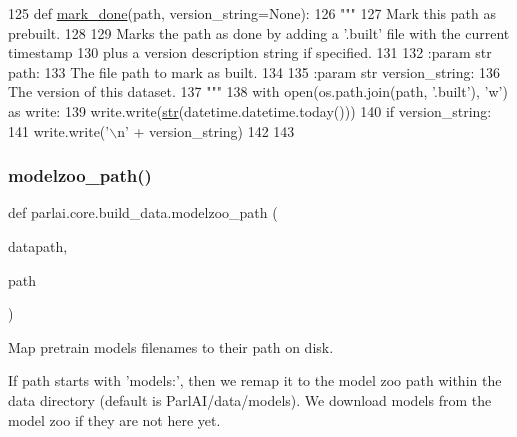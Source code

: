 \begin{DoxyCode}
125 \textcolor{keyword}{def }\hyperlink{namespaceparlai_1_1core_1_1build__data_a2527e6d29b0ccb7b841182890ac36a59}{mark\_done}(path, version\_string=None):
126     \textcolor{stringliteral}{"""}
127 \textcolor{stringliteral}{    Mark this path as prebuilt.}
128 \textcolor{stringliteral}{}
129 \textcolor{stringliteral}{    Marks the path as done by adding a '.built' file with the current timestamp}
130 \textcolor{stringliteral}{    plus a version description string if specified.}
131 \textcolor{stringliteral}{}
132 \textcolor{stringliteral}{    :param str path:}
133 \textcolor{stringliteral}{        The file path to mark as built.}
134 \textcolor{stringliteral}{}
135 \textcolor{stringliteral}{    :param str version\_string:}
136 \textcolor{stringliteral}{        The version of this dataset.}
137 \textcolor{stringliteral}{    """}
138     with open(os.path.join(path, \textcolor{stringliteral}{'.built'}), \textcolor{stringliteral}{'w'}) \textcolor{keyword}{as} write:
139         write.write(\hyperlink{namespacegenerate__task__READMEs_a5b88452ffb87b78c8c85ececebafc09f}{str}(datetime.datetime.today()))
140         \textcolor{keywordflow}{if} version\_string:
141             write.write(\textcolor{stringliteral}{'\(\backslash\)n'} + version\_string)
142 
143 
\end{DoxyCode}
\mbox{\label{namespaceparlai_1_1core_1_1build__data_ad06e9e38ca85db9c4a676ccd9ae41649}} 
\subsubsection{\texorpdfstring{modelzoo\+\_\+path()}{modelzoo\_path()}}
{\footnotesize\ttfamily def parlai.\+core.\+build\+\_\+data.\+modelzoo\+\_\+path (\begin{DoxyParamCaption}\item[{}]{datapath,  }\item[{}]{path }\end{DoxyParamCaption})}

\begin{DoxyVerb}Map pretrain models filenames to their path on disk.

If path starts with 'models:', then we remap it to the model zoo path within the
data directory (default is ParlAI/data/models). We download models from the model
zoo if they are not here yet.
\end{DoxyVerb}
 

